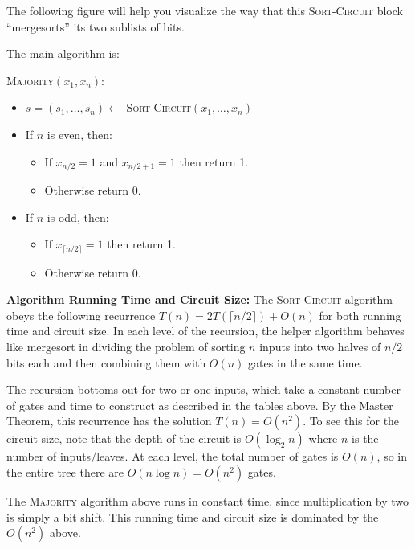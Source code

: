 \documentclass[12pt]{article}
\begin{document}
\begin{enumerate}
The following figure will help you visualize the way that this
\textsc{Sort-Circuit} block ``mergesorts'' its two sublists of bits.

\begin{figure}[hbt]
  
  \centerline{\box\graph}
\end{figure}

The main algorithm is:

\textsc{Majority}$(x_1,x_n)$:
\begin{itemize}
\item $s = (s_1,\ldots,s_n) \gets$
\textsc{Sort-Circuit}$(x_1,\ldots,x_n)$
\item If $n$ is even, then:
\begin{itemize}
\item If $x_{n/2} = 1$ and $x_{n/2 + 1}=1$ then return 1.
\item Otherwise return 0.
\end{itemize}
\item If $n$ is odd, then:
\begin{itemize}
\item If $x_{\lceil n/2 \rceil} = 1$ then return 1.
\item Otherwise return 0.
\end{itemize}
\end{itemize}

\textbf{Algorithm Running Time and Circuit Size:}
The \textsc{Sort-Circuit} algorithm obeys the following
recurrence $T(n) = 2T(\lceil n/2 \rceil) + O(n)$ for both running time
and circuit size.
In each level of the recursion, the helper algorithm behaves like
mergesort in dividing the problem
of sorting $n$ inputs into two halves of $n/2$ bits each and then
combining them with $O(n)$ gates in the same time.

The recursion bottoms out for two or one inputs, which take a constant
number of gates and time to construct as described in the tables above.
By the Master Theorem, this recurrence has the solution $T(n) = O(n^2)$.
To see this for the circuit size, note that the depth of the circuit
is $O(\log_2{n})$ where $n$ is the number of inputs/leaves. At each level,
the total number of gates is $O(n)$, so in the entire tree there are
$O(n\log{n}) = O(n^2)$ gates.

The \textsc{Majority} algorithm above runs in constant time, since
multiplication by two is simply a bit shift.
This running time and circuit size is dominated by the
$O(n^2)$ above.

\end{enumerate}
\end{document}
